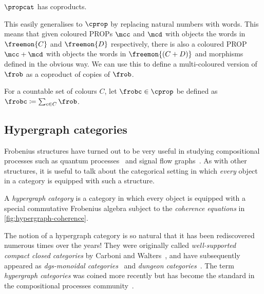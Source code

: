 \begin{theorem}
    \(\propcat\) has coproducts.
\end{theorem}

This easily generalises to \(\cprop\) by replacing natural numbers with words.
This means that given coloured PROPs \(\mcc\) and \(\mcd\) with objects the
words in \(\freemon{C}\) and \(\freemon{D}\) respectively, there is also a
coloured PROP \(\mcc + \mcd\) with objects the words in \(\freemon{(C + D)}\)
and morphisms defined in the obvious way.
We can use this to define a multi-coloured version of \(\frob\) as
a coproduct of copies of \(\frob\).

\begin{definition}
    \label{def:frobc}
    For a countable set of colours \(C\), let \(\frobc \in \cprop\) be
    defined as \(\frobc \coloneqq \sum_{c \in C}\frob\).
\end{definition}

\subsection{Hypergraph categories}

Frobenius structures have turned out to be very useful in studying compositional
processes such as quantum processes~\cite{coecke2008interacting} and signal flow
graphs~\cite{bonchi2014categorical,bonchi2015full}.
As with other structures, it is useful to talk about the categorical setting in
which \emph{every} object in a category is equipped with such a structure.

\begin{definition}
    \label{def:hypergraph-category}
    A \emph{hypergraph category} is a category in which every object is equipped
    with a special commutative Frobenius algebra subject to the
    \emph{coherence equations} in \cref{fig:hypergraph-coherence}.
\end{definition}



\begin{remark}
    The notion of a hypergraph category is so natural that it has been
    rediscovered numerous times over the years!
    They were originally called \emph{well-supported compact closed categories}
    by Carboni and Walters~\cite{carboni1987cartesian}, and have subsequently
    appeared as
    \emph{dgs-monoidal categories}~\cite{katis1997bicategories,gadducci1998inductive,gadducci1999bicategorical,bruni2002normal}
    and \emph{dungeon categories}~\cite{morton2014belief}.
    The term \emph{hypergraph categories} was coined more recently but has
    become the standard in the compositional processes
    community~\cite{kissinger2015finite,fong2015decorated,baez2016compositional,baez2018compositional}.
\end{remark}

